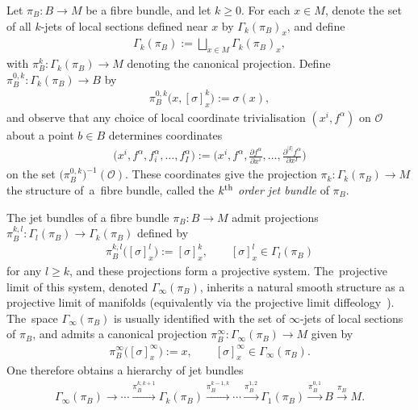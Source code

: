 \documentclass[pdftex]{sigma}
\numberwithin{equation}{section}
\def\OO{{\mathcal{O}}}
\begin{document}
\begin{Definition}
Let $\pi_{B}\colon B\rightarrow M$ be a fibre bundle, and let $k\geq 0$. For each $x\in M$, denote the set of all $k$-jets of local sections defined near $x$ by $\Gamma_{k}(\pi_{B})_{x}$, and define
\begin{gather*}
\Gamma_{k}(\pi_{B}):=\bigsqcup_{x\in M}\Gamma_{k}(\pi_{B})_{x},
\end{gather*}
with $\pi_{B}^{k}\colon \Gamma_{k}(\pi_{B})\rightarrow M$ denoting the canonical projection. Define $\pi_{B}^{0,k}\colon \Gamma_{k}(\pi_{B})\rightarrow B$ by
\begin{gather*}
\pi_{B}^{0,k}\big(x,[\sigma]^{k}_{x}\big):=\sigma(x),
\end{gather*}
and observe that any choice of local coordinate trivialisation $(x^{i},f^{\alpha})$ on $\OO$ about a point $b\in B$ determines coordinates
\begin{gather*}%
\big(x^{i},f^{\alpha},f^{\alpha}_{i},\dots,f^{\alpha}_{I}\big):=\bigg(x^{i},f^{\alpha},\frac{\partial f^{\alpha}}{\partial x^{i}},\dots,\frac{\partial^{|I|}f^{\alpha}}{\partial x^{I}}\bigg)
\end{gather*}
on the set $\big(\pi^{0,k}_{B}\big)^{-1}(\OO)$. These coordinates give the projection $\pi_{k}\colon \Gamma_{k}(\pi_{B})\rightarrow M$ the structure of~a~fibre bundle, called the $k^{\rm th}$ \textit{order jet bundle} of $\pi_{B}$.
\end{Definition}

The jet bundles of a fibre bundle $\pi_{B}\colon B\rightarrow M$ admit projections $\pi_{B}^{k,l}\colon \Gamma_{l}(\pi_{B})\rightarrow \Gamma_{k}(\pi_{B})$ defined by
\begin{gather*}
\pi_{B}^{k,l}\big([\sigma]^{l}_{x}\big):=[\sigma]^{k}_{x},\qquad [\sigma]^{l}_{x}\in \Gamma_{l}(\pi_{B})
\end{gather*}
for any $l\geq k$, and these projections form a projective system. The~projective limit of this system, denoted $\Gamma_{\infty}(\pi_{B})$, inherits a natural smooth structure as a projective limit of manifolds \cite[Chapter One, Section A]{varbi} (equivalently via the projective limit diffeology~\cite[Section 1.39]{diffeology}). The~space $\Gamma_{\infty}(\pi_{B})$ is usually identified with the set of $\infty$-jets of local sections of $\pi_{B}$, and admits a canonical projection $\pi_{B}^{\infty}\colon \Gamma_{\infty}(\pi_{B})\rightarrow M$ given by
\begin{gather*}
\pi_{B}^{\infty}\big([\sigma]^{\infty}_{x}\big):=x,\qquad [\sigma]^{\infty}_{x}\in \Gamma_{\infty}(\pi_{B}).
\end{gather*}
One therefore obtains a hierarchy of jet bundles
\begin{gather*}
\Gamma_{\infty}(\pi_{B})\rightarrow\cdots\xrightarrow{\pi_{B}^{k,k+1}} \Gamma_{k}(\pi_{B})\xrightarrow{\pi_{B}^{k-1,k}}\cdots\xrightarrow{\pi_{B}^{1,2}} \Gamma_{1}(\pi_{B})\xrightarrow{\pi_{B}^{0,1}}B\xrightarrow{\pi_{B}}M.
\end{gather*}
\end{document}
